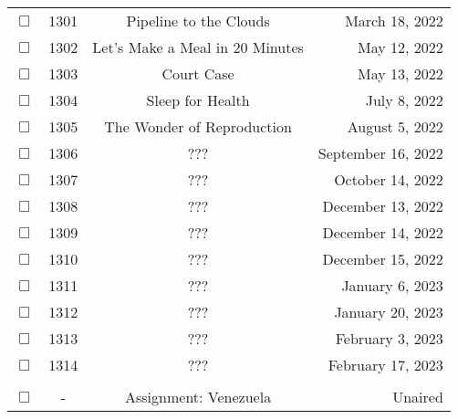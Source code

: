 \documentclass[12pt]{article}
\begin{document}
\begin{center}
\begin{longtable}[c]{cccr}
$\Box$&1301&Pipeline to the Clouds&March 18, 2022\\
$\Box$&1302&Let's Make a Meal in 20 Minutes&May 12, 2022\\
$\Box$&1303&Court Case&May 13, 2022\\
$\Box$&1304&Sleep for Health&July 8, 2022\\
$\Box$&1305&The Wonder of Reproduction&August 5, 2022\\
$\Box$&1306&???&September 16, 2022\\
$\Box$&1307&???&October 14, 2022\\
$\Box$&1308&???&December 13, 2022\\
$\Box$&1309&???&December 14, 2022\\
$\Box$&1310&???&December 15, 2022\\
$\Box$&1311&???&January 6, 2023\\
$\Box$&1312&???&January 20, 2023\\
$\Box$&1313&???&February 3, 2023\\
$\Box$&1314&???&February 17, 2023\\

\\  %
$\Box$&-&Assignment: Venezuela&Unaired\\
\end{longtable}\end{center}
\end{document}
